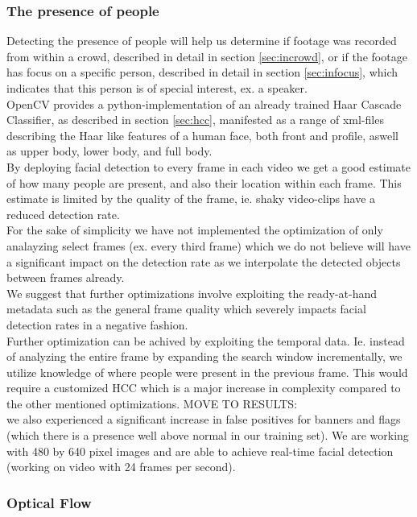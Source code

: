 \subsubsection{The presence of people}\label{sec:peopledata}
%
Detecting the presence of people will help us determine if footage was recorded from within a crowd, described in detail in section \ref{sec:incrowd}, or if the footage has focus on a specific person, described in detail in section \ref{sec:infocus}, which indicates that this person is of special interest, ex. a speaker.\\
%
OpenCV provides a python-implementation of an already trained Haar Cascade Classifier, as described in section \ref{sec:hcc}, manifested as a range of xml-files describing the Haar like features of a human face, both front and profile, aswell as upper body, lower body, and full body.\\
By deploying facial detection to every frame in each video we get a good estimate of how many people are present, and also their location within each frame. This estimate is limited by the quality of the frame, ie. shaky video-clips have a reduced detection rate.\\
For the sake of simplicity we have not implemented the optimization of only analayzing select frames (ex. every third frame) which we do not believe will have a significant impact on the detection rate as we interpolate the detected objects between frames already.\\
We suggest that further optimizations involve exploiting the ready-at-hand metadata such as the general frame quality which severely impacts facial detection rates in a negative fashion.\\
Further optimization can be achived by exploiting the temporal data. Ie. instead of analyzing the entire frame by expanding the search window incrementally, we utilize knowledge of where people were present in the previous frame. This would require a customized HCC which is a major increase in complexity compared to the other mentioned optimizations.
%
MOVE TO RESULTS:\\
we also experienced a significant increase in false positives for banners and flags (which there is a presence well above normal in our training set). We are working with 480 by 640 pixel images and are able to achieve real-time facial detection (working on video with 24 frames per second).\\
%
\subsubsection{Optical Flow}\label{sec:opticalflowdata}
%
